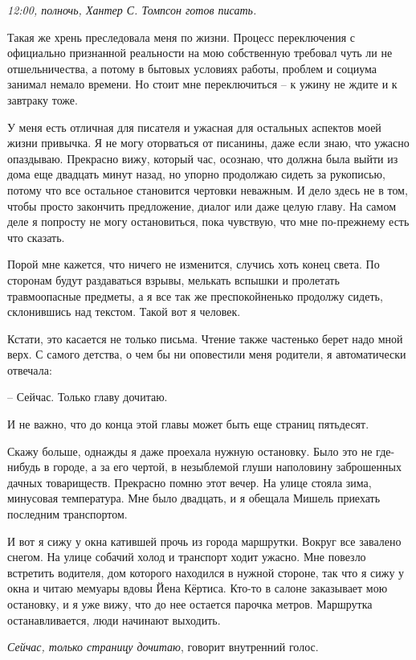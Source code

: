 \documentclass[
]{book}
\begin{document}
\emph{12:00, полночь, Хантер С. Томпсон готов писать.}

Такая же хрень преследовала меня по жизни. Процесс переключения с официально признанной реальности на мою собственную требовал чуть ли не отшельничества, а потому в бытовых условиях работы, проблем и социума занимал немало времени. Но стоит мне переключиться -- к ужину не ждите и к завтраку тоже.

У меня есть отличная для писателя и ужасная для остальных аспектов моей жизни привычка. Я не могу оторваться от писанины, даже если знаю, что ужасно опаздываю. Прекрасно вижу, который час, осознаю, что должна была выйти из дома еще двадцать минут назад, но упорно продолжаю сидеть за рукописью, потому что все остальное становится чертовки неважным. И дело здесь не в том, чтобы просто закончить предложение, диалог или даже целую главу. На самом деле я попросту не могу остановиться, пока чувствую, что мне по-прежнему есть что сказать.

Порой мне кажется, что ничего не изменится, случись хоть конец света. По сторонам будут раздаваться взрывы, мелькать вспышки и пролетать травмоопасные предметы, а я все так же преспокойненько продолжу сидеть, склонившись над текстом. Такой вот я человек.

Кстати, это касается не только письма. Чтение также частенько берет надо мной верх. С самого детства, о чем бы ни оповестили меня родители, я автоматически отвечала:

-- Сейчас. Только главу дочитаю.

И не важно, что до конца этой главы может быть еще страниц пятьдесят.

Скажу больше, однажды я даже проехала нужную остановку. Было это не где-нибудь в городе, а за его чертой, в незыблемой глуши наполовину заброшенных дачных товариществ. Прекрасно помню этот вечер. На улице стояла зима, минусовая температура. Мне было двадцать, и я обещала Мишель приехать последним транспортом.

И вот я сижу у окна катившей прочь из города маршрутки. Вокруг все завалено снегом. На улице собачий холод и транспорт ходит ужасно. Мне повезло встретить водителя, дом которого находился в нужной стороне, так что я сижу у окна и читаю мемуары вдовы Йена Кёртиса. Кто-то в салоне заказывает мою остановку, и я уже вижу, что до нее остается парочка метров. Маршрутка останавливается, люди начинают выходить.

\emph{Сейчас, только страницу дочитаю}, говорит внутренний голос.
\end{document}
